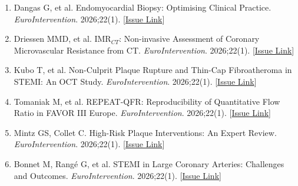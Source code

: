\documentclass[12pt,a4paper]{article}
\begin{document}
\begin{enumerate}
    \item Dangas G, et al. Endomyocardial Biopsy: Optimising Clinical Practice. \textit{EuroIntervention}. 2026;22(1). [\href{https://eurointervention.pcronline.com/issue/volume-22/number-1}{Issue Link}]

    \item Driessen MMD, et al. IMR$_{CT}$: Non-invasive Assessment of Coronary Microvascular Resistance from CT. \textit{EuroIntervention}. 2026;22(1). [\href{https://eurointervention.pcronline.com/issue/volume-22/number-1}{Issue Link}]

    \item Kubo T, et al. Non-Culprit Plaque Rupture and Thin-Cap Fibroatheroma in STEMI: An OCT Study. \textit{EuroIntervention}. 2026;22(1). [\href{https://eurointervention.pcronline.com/issue/volume-22/number-1}{Issue Link}]

    \item Tomaniak M, et al. REPEAT-QFR: Reproducibility of Quantitative Flow Ratio in FAVOR III Europe. \textit{EuroIntervention}. 2026;22(1). [\href{https://eurointervention.pcronline.com/issue/volume-22/number-1}{Issue Link}]

    \item Mintz GS, Collet C. High-Risk Plaque Interventions: An Expert Review. \textit{EuroIntervention}. 2026;22(1). [\href{https://eurointervention.pcronline.com/issue/volume-22/number-1}{Issue Link}]

    \item Bonnet M, Rangé G, et al. STEMI in Large Coronary Arteries: Challenges and Outcomes. \textit{EuroIntervention}. 2026;22(1). [\href{https://eurointervention.pcronline.com/issue/volume-22/number-1}{Issue Link}]
\end{enumerate}
\end{document}
